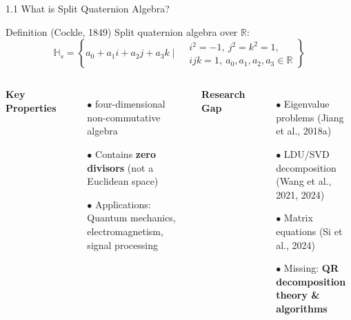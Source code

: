 \documentclass{beamer}
\begin{document}
\begin{frame}{1.1 What is Split Quaternion Algebra?}
  \begin{exampleblock}{Definition (Cockle, 1849)}
    Split quaternion algebra over $\mathbb{R}$:
    \[
    \mathbb{H}_{s}=\left\{a_{0}+a_{1}i+a_{2}j+a_{3}k \mid 
    \begin{aligned}
    &i^2=-1,\ j^2=k^2=1, \\
    &ijk=1,\ a_0,a_1,a_2,a_3\in\mathbb{R}
    \end{aligned}\right\}
    \]
  \end{exampleblock}
  \vspace{0em}
  
  \begin{columns}[T]
    \textbf{Key Properties}
    \begin{itemize}
        \item[$\bullet$] four-dimensional non-commutative algebra
        \item[$\bullet$] Contains \textbf{zero divisors} (not a Euclidean space)
        \item[$\bullet$] Applications: Quantum mechanics, electromagnetism, signal processing
    \end{itemize}
      
    
    \textbf{Research Gap}
    \begin{itemize}
        \item[$\bullet$] Eigenvalue problems (Jiang et al., 2018a)
        \item[$\bullet$] LDU/SVD decomposition (Wang et al., 2021, 2024)
        \item[$\bullet$] Matrix equations (Si et al., 2024)
        \item[$\bullet$] Missing: \textbf{QR decomposition theory \& algorithms}
    \end{itemize}
  \end{columns}
\end{frame}
\end{document}
